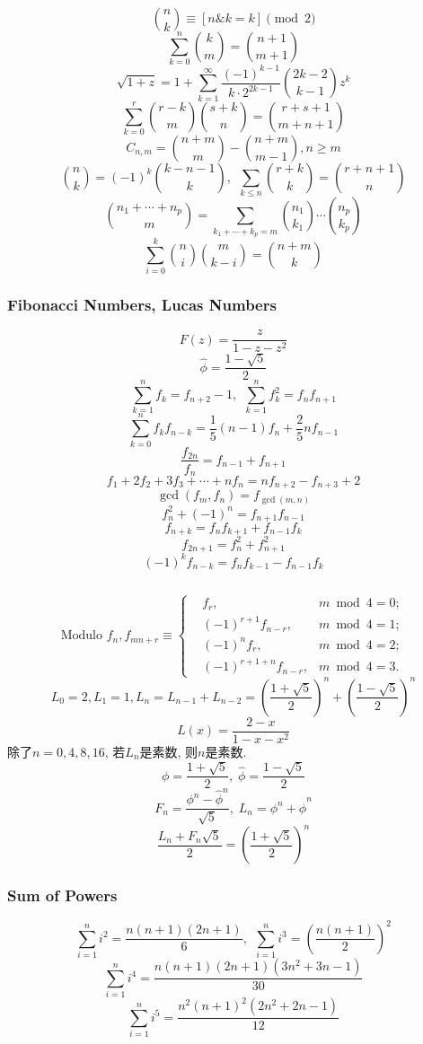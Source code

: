 \[ \binom{n}{k} \equiv [n\& k=k] \pmod 2 \]
\[ \sum_{k=0}^n \binom{k}{m} = \binom{n+1}{m+1} \]
\[ \sqrt{1+z} = 1 + \sum_{k=1}^{\infty}\frac{(-1)^{k-1}}{k\cdot 2^{2k-1}}\binom{2k-2}{k-1}z^k \]
\[ \sum_{k=0}^{r}\binom{r-k}{m}\binom{s+k}{n} = \binom{r+s+1}{m+n+1} \]
\[ C_{n, m} = \binom{n+m}{m} - \binom{n+m}{m-1}, n \geq m \]
\[ \binom{n}{k} = (-1)^k\binom{k-n-1}{k},\ \ \sum_{k \leq n}\binom{r+k}{k} = \binom{r+n+1}{n} \]
\[ \binom{n_1+\cdots+n_p}{m}=\sum_{k_1+\cdots+k_p=m}\binom{n_1}{k_1}\cdots\binom{n_p}{k_p}\]
\[ \sum_{i=0}^k \binom{n}{i}\binom{m}{k-i} = \binom{n+m}{k}\]

\subsubsection{Fibonacci Numbers, Lucas Numbers}
\[ F(z) = \frac{z}{1-z-z^2} \]
\[ \hat{\phi} = \frac{1-\sqrt{5}}{2} \]
\[ \sum_{k=1}^nf_k = f_{n+2}-1,\ \ \sum_{k=1}^nf^2_k = f_nf_{n+1} \]
\[ \sum_{k=0}^nf_kf_{n-k} = \frac{1}{5}(n-1)f_n+\frac{2}{5}nf_{n-1} \]
\[ \frac{f_{2n}}{f_n} = f_{n-1} + f_{n+1}\]
\[ f_1+2f_2+3f_3+\cdots+nf_n=nf_{n+2}-f_{n+3}+2\]
\[ \gcd(f_m,f_n)=f_{\gcd(m,n)}\]
\[ f^2_n + (-1)^n = f_{n+1}f_{n-1} \]
\[ f_{n+k} = f_nf_{k+1} + f_{n-1}f_k \]
\[ f_{2n+1} = f^2_n+f^2_{n+1} \]
\[ (-1)^kf_{n-k} = f_{n}f_{k-1} - f_{n-1}f_{k} \]
\begin{small}
\inputminted{python}{src/tbr/fib.py}
\end{small}
\[ \text{Modulo }f_n, f_{mn+r} \equiv \left\{
\begin{aligned}
&f_r,& m \bmod 4 = 0; \\
&(-1)^{r+1}f_{n-r},& m \bmod 4 = 1; \\
&(-1)^nf_r,& m \bmod 4 = 2; \\
&(-1)^{r+1+n}f_{n-r},& m \bmod 4 = 3.
\end{aligned}
\right.
\]
\[ L_0=2,L_1=1,L_n=L_{n-1}+L_{n-2}=\left(\frac{1+\sqrt{5}}{2}\right)^n+\left(\frac{1-\sqrt{5}}{2}\right)^n \]
\[ L(x)=\frac{2-x}{1-x-x^2} \]
除了$n=0,4,8,16$, 若$L_n$是素数, 则$n$是素数.
$$\phi = \frac {1 + \sqrt 5} 2, \; \hat\phi = \frac {1 - \sqrt 5} 2$$
$$F_n = \frac {\phi^n - {\hat\phi} ^ n} {\sqrt 5}, \; L_n = \phi ^ n + {\hat\phi} ^ n$$
$$\frac {L_n + F_n \sqrt 5} 2 = \left( \frac {1 + \sqrt 5} 2 \right) ^ n$$

\subsubsection{Sum of Powers}
\[\sum_{i=1}^ni^2=\frac{n(n+1)(2n+1)}{6},\ \ \sum_{i=1}^ni^3=\left(\frac{n(n+1)}{2}\right)^2\]
\[\sum_{i=1}^ni^4=\frac{n(n+1)(2n+1)(3n^2+3n-1)}{30}\]
\[\sum_{i=1}^ni^5=\frac{n^2(n+1)^2(2n^2+2n-1)}{12}\]

